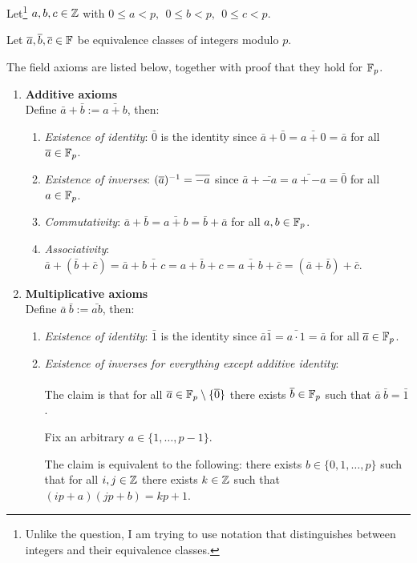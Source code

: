 \documentclass[12pt]{article}
\begin{document}
\begin{mdframed}
  Let\footnote{Unlike the question, I am trying to use notation that
    distinguishes between integers and their equivalence classes.}
  $a, b, c \in \mathbb{Z}$ with $0 \leq a < p, ~~ 0 \leq b < p, ~~ 0 \leq c < p$.

  Let $\overline a, \overline b, \overline c \in \mathbb{F}$ be equivalence classes of integers modulo $p$.

  The field axioms are listed below, together with proof that they hold for $\mathbb{F}_p$.
  \begin{enumerate}
  \item \textbf{Additive axioms}\\
    Define $\bar a + \bar b := \bar{a + b}$, then:
    \begin{enumerate}
    \item \textit{Existence of identity}: $\bar 0$ is the identity since
      $\bar a + \bar 0 = \bar{a + 0} = \bar{a}$ for all $\overline a \in \mathbb{F}_p$.
    \item \textit{Existence of inverses}: $(\overline a)^{-1} = \overline{-a}$ since
      $\bar a + \bar{-a} = \bar{a + -a} = \bar{0}$ for all $a \in \mathbb{F}_p$.
    \item \textit{Commutativity}:
      $\bar a + \bar b = \bar{a + b} = \bar{b} + \bar{a}$ for all $a, b \in \mathbb{F}_p$.
    \item \textit{Associativity}:
      $\bar a + (\bar b + \bar c) = \bar a + \bar {b + c} = \bar{a + b + c} =
      \bar{a + b} + \bar{c} = (\bar a + \bar b) + \bar{c}$.
    \end{enumerate}
  \item \textbf{Multiplicative axioms}\\
    Define $\bar a ~ \bar b := \bar{ab}$, then:
    \begin{enumerate}
    \item \textit{Existence of identity}: $\bar 1$ is the identity since
      $\bar a \bar 1 = \bar{a\cdot 1} = \bar{a}$ for all $\overline a \in \mathbb{F}_p$.
      \newpage
    \item \textit{Existence of inverses for everything except additive identity}:\\\\
      The claim is that for all $\overline a \in \mathbb{F}_p \setminus \{\overline 0\}$ there
      exists $\overline b \in \mathbb{F}_p$ such that $\bar a ~ \bar b = \bar 1$.

      Fix an arbitrary $a \in \{1, \ldots, p-1\}$.

      The claim is equivalent to the following: there exists
      $b \in \{0, 1, \ldots, p\}$ such that for all $i, j \in \mathbb{Z}$ there exists
      $k \in \mathbb{Z}$ such that $(ip + a)(jp + b) = kp + 1$.


\end{enumerate}
\end{enumerate}
\end{mdframed}
\end{document}
